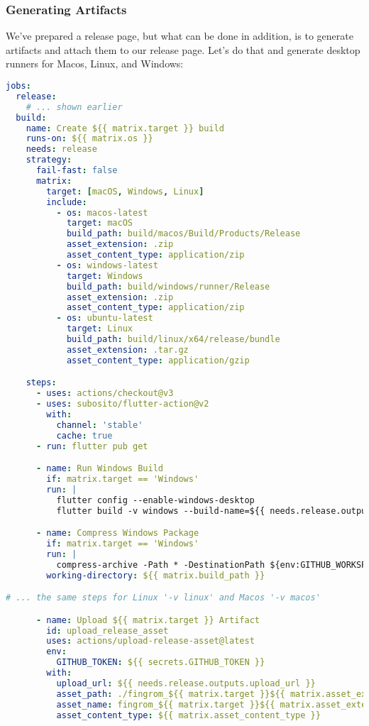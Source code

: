 \subsubsection{Generating Artifacts}

We've prepared a release page, but what can be done in addition, is to generate artifacts and attach them to our release
page. Let's do that and generate desktop runners for Macos, Linux, and Windows:

\begin{lstlisting}[language=yaml]
jobs:
  release:
    # ... shown earlier
  build:
    name: Create ${{ matrix.target }} build
    runs-on: ${{ matrix.os }}
    needs: release
    strategy:
      fail-fast: false
      matrix:
        target: [macOS, Windows, Linux]
        include:
          - os: macos-latest
            target: macOS
            build_path: build/macos/Build/Products/Release
            asset_extension: .zip
            asset_content_type: application/zip
          - os: windows-latest
            target: Windows
            build_path: build/windows/runner/Release
            asset_extension: .zip
            asset_content_type: application/zip
          - os: ubuntu-latest
            target: Linux
            build_path: build/linux/x64/release/bundle
            asset_extension: .tar.gz
            asset_content_type: application/gzip

    steps:
      - uses: actions/checkout@v3
      - uses: subosito/flutter-action@v2
        with:
          channel: 'stable'
          cache: true
      - run: flutter pub get

      - name: Run Windows Build 
        if: matrix.target == 'Windows'
        run: |
          flutter config --enable-windows-desktop
          flutter build -v windows --build-name=${{ needs.release.outputs.version }} --build-number=${{ needs.release.outputs.build_number }} --release

      - name: Compress Windows Package
        if: matrix.target == 'Windows'
        run: |
          compress-archive -Path * -DestinationPath ${env:GITHUB_WORKSPACE}/fingrom_${{ matrix.target }}${{ matrix.asset_extension }}
        working-directory: ${{ matrix.build_path }}

# ... the same steps for Linux '-v linux' and Macos '-v macos'

      - name: Upload ${{ matrix.target }} Artifact
        id: upload_release_asset
        uses: actions/upload-release-asset@latest
        env:
          GITHUB_TOKEN: ${{ secrets.GITHUB_TOKEN }}
        with:
          upload_url: ${{ needs.release.outputs.upload_url }}
          asset_path: ./fingrom_${{ matrix.target }}${{ matrix.asset_extension }}
          asset_name: fingrom_${{ matrix.target }}${{ matrix.asset_extension }}
          asset_content_type: ${{ matrix.asset_content_type }}
\end{lstlisting}
